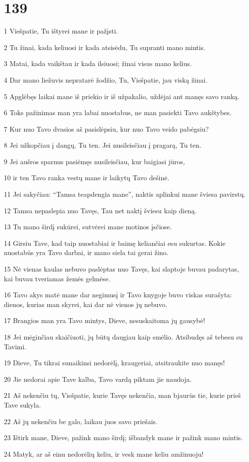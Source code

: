 \chapter{139}


\par 1 Viešpatie, Tu ištyrei mane ir pažįsti. 
\par 2 Tu žinai, kada keliuosi ir kada atsisėdu, Tu supranti mano mintis. 
\par 3 Matai, kada vaikštau ir kada ilsiuosi; žinai visus mano kelius. 
\par 4 Dar mano liežuvis nepratarė žodžio, Tu, Viešpatie, jau viską žinai. 
\par 5 Apglėbęs laikai mane iš priekio ir iš užpakalio, uždėjai ant manęs savo ranką. 
\par 6 Toks pažinimas man yra labai nuostabus, ne man pasiekti Tavo aukštybes. 
\par 7 Kur nuo Tavo dvasios aš pasislėpsiu, kur nuo Tavo veido pabėgsiu? 
\par 8 Jei užkopčiau į dangų, Tu ten. Jei nusileisčiau į pragarą, Tu ten. 
\par 9 Jei aušros sparnus pasiėmęs nusileisčiau, kur baigiasi jūros, 
\par 10 ir ten Tavo ranka vestų mane ir laikytų Tavo dešinė. 
\par 11 Jei sakyčiau: “Tamsa teapdengia mane”, naktis aplinkui mane šviesa pavirstų. 
\par 12 Tamsa nepaslepia nuo Tavęs, Tau net naktį šviesu kaip dieną. 
\par 13 Tu mano širdį sukūrei, sutvėrei mane motinos įsčiose. 
\par 14 Girsiu Tave, kad taip nuostabiai ir baimę keliančiai esu sukurtas. Kokie nuostabūs yra Tavo darbai, ir mano siela tai gerai žino. 
\par 15 Nė vienas kaulas nebuvo paslėptas nuo Tavęs, kai slaptoje buvau padarytas, kai buvau tveriamas žemės gelmėse. 
\par 16 Tavo akys matė mane dar negimusį ir Tavo knygoje buvo viskas surašyta: dienos, kurias man skyrei, kai dar nė vienos jų nebuvo. 
\par 17 Brangios man yra Tavo mintys, Dieve, nesuskaitoma jų gausybė! 
\par 18 Jei mėginčiau skaičiuoti, jų būtų daugiau kaip smėlio. Atsibudęs aš tebesu su Tavimi. 
\par 19 Dieve, Tu tikrai sunaikinsi nedorėlį, kraugeriai, atsitraukite nuo manęs! 
\par 20 Jie nedorai apie Tave kalba, Tavo vardą piktam jie naudoja. 
\par 21 Aš nekenčiu tų, Viešpatie, kurie Tavęs nekenčia, man bjaurūs tie, kurie prieš Tave sukyla. 
\par 22 Aš jų nekenčiu be galo, laikau juos savo priešais. 
\par 23 Ištirk mane, Dieve, pažink mano širdį; išbandyk mane ir pažink mano mintis. 
\par 24 Matyk, ar aš einu nedorėlių keliu, ir vesk mane keliu amžinuoju!


